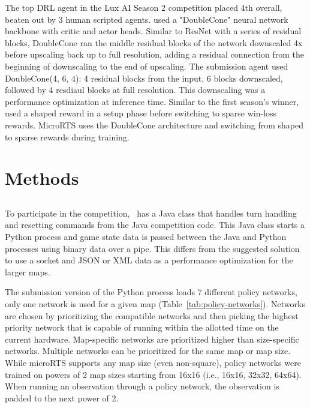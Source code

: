 \documentclass{article}
\begin{document}
The top DRL agent in the Lux AI Season 2 competition placed 4th overall, beaten out by 3
human scripted agents. \citet{Ferdinand2021doublecone} used a "DoubleCone" neural
network backbone with critic and actor heads. Similar to ResNet with a series of
residual blocks, DoubleCone ran the middle residual blocks of the network downscaled 4x
before upscaling back up to full resolution, adding a residual connection from the
beginning of downscaling to the end of upscaling. The submission agent used
DoubleCone(4, 6, 4): 4 residual blocks from the input, 6 blocks downscaled, followed by
4 resdiaul blocks at full resolution. This downscaling was a performance optimization at
inference time. Similar to the first season's winner, \citet{Ferdinand2021doublecone}
used a shaped reward in a setup phase before switching to sparse win-loss rewards. MicroRTS uses the DoubleCone architecture and switching from shaped to sparse rewards
during training.

\section{Methods}
\subsection{\agentName}
To participate in the competition, \agentName\ has a Java class that handles turn
handling and resetting commands from the Java competition code. This Java class starts a
Python process and game state data is passed between the Java and Python processes using
binary data over a pipe. This differs from the suggested solution to use a socket and
JSON or XML data as a performance optimization for the larger maps.

The submission version of the Python process loads 7 different policy networks, only one network is used
for a given map (Table~\ref{tab:policy-networks}). Networks are chosen by prioritizing
the compatible networks and then picking the highest priority network that is capable of
running within the allotted time on the current hardware. Map-specific networks are
prioritized higher than size-specific networks. Multiple networks can be prioritized for
the same map or map size. While microRTS supports any map size (even non-square), policy networks were trained on
powers of 2 map sizes starting from 16x16 (i.e., 16x16, 32x32, 64x64). When running an
observation through a policy network, the observation is padded to the next power of 2.
\end{document}

